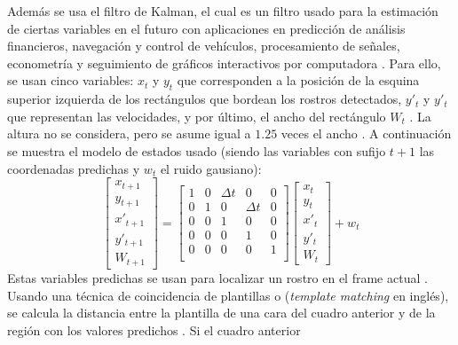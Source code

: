 \documentclass[a4paper,openright,12pt]{report}
\begin{document}
Además se usa el filtro de Kalman, el cual es un filtro usado para la estimación
de ciertas variables en el futuro con aplicaciones en predicción de análisis
financieros, navegación y control de vehículos, procesamiento de señales,
econometría y seguimiento de gráficos interactivos por computadora
\cite{bishop2001introduction}. Para ello, se usan cinco variables: $x_{t}$ 
y $y_{t}$ que corresponden a la posición de la esquina superior izquierda de los
rectángulos que bordean los rostros detectados, $y'_{t}$ y $y'_{t}$ que
representan las velocidades, y por último, el ancho del rectángulo $W_{t}$
\cite{shaik2007robust}. La altura no se considera, pero se asume igual a $1.25$
veces el ancho \cite{shaik2007robust}. A continuación se muestra el modelo de
estados usado (siendo las variables con sufijo ${t + 1}$ las coordenadas
predichas y $w_{t}$ el ruido gausiano):
\[
    \begin{bmatrix}
        x_{t+1}\\
        y_{t+1}\\
        x'_{t+1}\\
        y'_{t+1}\\
        W_{t+1}
    \end{bmatrix}
    =
    \begin{bmatrix}
        1   &   0   &   \Delta{t}   &   0           &   0\\
        0   &   1   &   0           &   \Delta{t}   &   0\\
        0   &   0   &   1           &   0           &   0\\
        0   &   0   &   0           &   1           &   0\\
        0   &   0   &   0           &   0           &   1\\
    \end{bmatrix}
    \begin{bmatrix}
        x_{t}\\
        y_{t}\\
        x'_{t}\\
        y'_{t}\\
        W_{t}
    \end{bmatrix}
    +
    w_{t}
\]
Estas variables predichas se usan para localizar un rostro en el frame
actual \cite{shaik2007robust}. Usando una técnica de coincidencia de plantillas o (\textit{template
matching} en inglés), se calcula la distancia entre la plantilla de una cara del
cuadro anterior y de la región con los valores predichos \cite{shaik2007robust}. Si el cuadro anterior
\end{document}

